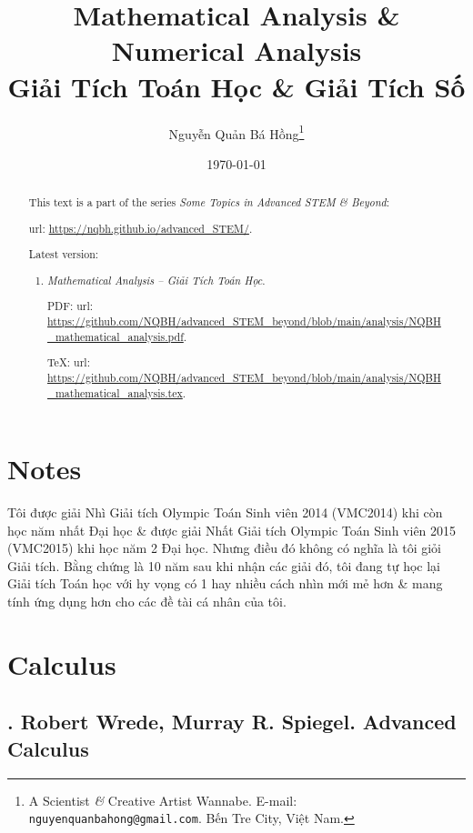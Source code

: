 \documentclass{article}
\title{Mathematical Analysis \& Numerical Analysis\\Giải Tích Toán Học \& Giải Tích Số}
\author{Nguyễn Quản Bá Hồng\footnote{A Scientist {\it\&} Creative Artist Wannabe. E-mail: {\tt nguyenquanbahong@gmail.com}. Bến Tre City, Việt Nam.}}
\date{\today}
\begin{document}
\maketitle
\begin{abstract}
	This text is a part of the series {\it Some Topics in Advanced STEM \& Beyond}:
	
	{\sc url}: \url{https://nqbh.github.io/advanced_STEM/}.
	
	Latest version:
	\begin{enumerate}
		\item {\it Mathematical Analysis -- Giải Tích Toán Học}.
		
		PDF: {\sc url}: \url{https://github.com/NQBH/advanced_STEM_beyond/blob/main/analysis/NQBH_mathematical_analysis.pdf}.
		
		\TeX: {\sc url}: \url{https://github.com/NQBH/advanced_STEM_beyond/blob/main/analysis/NQBH_mathematical_analysis.tex}.
	\end{enumerate}
\end{abstract}
\tableofcontents


\section*{Notes}
Tôi được giải Nhì Giải tích Olympic Toán Sinh viên 2014 (VMC2014) khi còn học năm nhất Đại học \& được giải Nhất Giải tích Olympic Toán Sinh viên 2015 (VMC2015) khi học năm 2 Đại học. Nhưng điều đó không có nghĩa là tôi giỏi Giải tích. Bằng chứng là 10 năm sau khi nhận các giải đó, tôi đang tự học lại Giải tích Toán học với hy vọng có 1 hay nhiều cách nhìn mới mẻ hơn \& mang tính ứng dụng hơn cho các đề tài cá nhân của tôi.


\section{Calculus}

\subsection{\cite{Wrede_Spiegel2010}. {\sc Robert Wrede, Murray R. Spiegel}. Advanced Calculus}
{}
\end{document}
